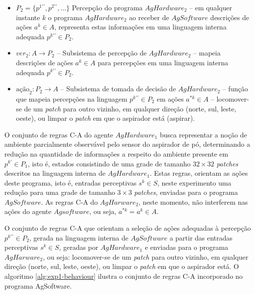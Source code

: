 \begin{itemize}
    \item $P_2 = \{p^{1\prime\prime}, p^{2\prime\prime}, \ldots\}$	Percepção do programa $AgHardware_2$ – em qualquer instante $k$ o programa $AgHardware_2$ ao receber de $AgSoftware$ descrições de ações $a^k \in A$, representa estas informações em uma linguagem interna adequada $p^{k\prime\prime} \in P_2$.
    
    \item $ver_2: A  \rightarrow P_2$ -- Subsistema de percepção de $AgHardware_2$ – mapeia descrições de ações $a^k \in A$ para percepções em uma linguagem interna adequada $p^{k\prime\prime} \in P_2$.
    
    \item $\textrm{ação}_2: P_2 \rightarrow A$ -- Subsistema de tomada de decisão de $AgHardware_2$ – função que mapeia percepções na linguagem $p^{k\prime\prime} \in P_2$ em ações $a^{*k} \in A$ – locomover-se de um \textit{patch} para outro vizinho, em qualquer direção (norte, sul, leste, oeste), ou limpar o \textit{patch} em que o aspirador está (aspirar).
    
\end{itemize}

O conjunto de regras C-A do agente $AgHardware_1$ busca representar a noção de ambiente parcialmente observável pelo sensor do aspirador de pó, determinando a redução na quantidade de informações a respeito do ambiente presente em $p^{k\prime} \in P_1$, isto é, estados consistindo de uma grade de tamanho $32 \times 32$ \textit{patches} descritos na linguagem interna de $AgHardware_1$. Estas regras, orientam as ações deste programa, isto é, entradas perceptivas $s^k \in S$, neste experimento uma redução para uma grade de tamanho $3 \times 3$ \textit{patches}, enviadas para o programa $AgSoftware$. As regras C-A do $AgHarware_2$, neste momento, não interferem nas ações do agente  $Agsoftware$, ou seja, $a^{*k} = a^k \in A$.

O conjunto de regras C-A que orientam a seleção de ações adequadas à percepção $p^{k\prime\prime} \in P_2$, gerada na linguagem interna de $AgSoftware$ a partir das entradas perceptivas $s^k \in S$, geradas por $AgHardware_1$ e enviadas para o programa $AgHarware_2$, ou seja: locomover-se de um \textit{patch} para outro vizinho, em qualquer direção (norte, sul, leste, oeste), ou limpar o \textit{patch} em que o aspirador está. O algoritmo \ref{alg:exp1-behaviour} ilustra o conjunto de regras C-A incorporado no programa AgSoftware.

